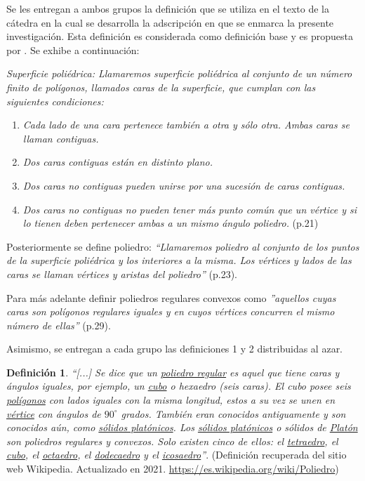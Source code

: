\documentclass[oneside,spanish]{amsart}
\numberwithin{equation}{section}
\theoremstyle{definition}
\newtheorem{defin}{\bfseries Definición}
\begin{document}
Se les entregan a ambos grupos la definición que se utiliza en el texto de la cátedra en la cual se desarrolla la adscripción en que se enmarca la presente investigación. Esta definición es considerada como definición base y es propuesta por \citet{mantica22}. Se exhibe a continuación:

\textit{Superficie poliédrica: Llamaremos superficie poliédrica al conjunto de un número finito de polígonos, llamados caras de la superficie, que cumplan con las siguientes condiciones:}

\begin{enumerate}[1.]
	\item	\textit{Cada lado de una cara pertenece también a otra y sólo otra. Ambas caras se llaman contiguas.}
	\item	\textit{Dos caras contiguas están en distinto plano.} 
	\item	\textit{Dos caras no contiguas pueden unirse por una sucesión de caras contiguas.}
	\item	\textit{Dos caras no contiguas no pueden tener más punto común que un vértice y si lo tienen deben pertenecer ambas a un mismo ángulo poliedro.} (p.21)
\end{enumerate}

Posteriormente se define poliedro: \textit{“Llamaremos poliedro al conjunto de los puntos de la superficie poliédrica y los interiores a la misma. Los vértices y lados de las caras se llaman vértices y aristas del poliedro”} (p.23).

Para más adelante definir poliedros regulares convexos como \textit{”aquellos cuyas caras son polígonos regulares iguales y en cuyos vértices concurren el mismo número de ellas”} (p.29).

Asimismo, se entregan a cada grupo las definiciones 1 y 2 distribuidas al azar.

\begin{defin}
	\textit{“[...] Se dice que un \underline{poliedro regular} es aquel que tiene caras y ángulos iguales, por ejemplo, un \underline{cubo} o hexaedro (seis caras). El cubo posee seis \underline{polígonos} con lados iguales con la misma longitud, estos a su vez se unen en \underline{vértice} con ángulos de $90^\circ$ grados. También eran conocidos antiguamente y son conocidos aún, como \underline{sólidos platónicos}. Los \underline{sólidos platónicos} o sólidos de \underline{Platón} son poliedros regulares y convexos. Solo existen cinco de ellos: el \underline{tetraedro}, el \underline{cubo}, el \underline{octaedro}, el \underline{dodecaedro} y el \underline{icosaedro}”}. (Definición recuperada del sitio web Wikipedia. Actualizado en 2021. \url{https://es.wikipedia.org/wiki/Poliedro})
\end{defin}
\end{document}
